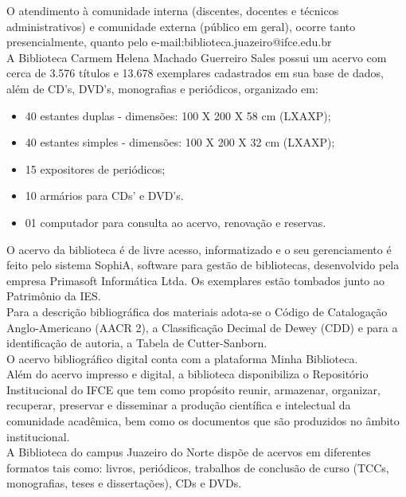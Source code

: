 O atendimento à comunidade interna (discentes, docentes e técnicos administrativos) e comunidade externa (público em geral), ocorre tanto presencialmente, quanto pelo e-mail:biblioteca.juazeiro@ifce.edu.br\\

A Biblioteca Carmem Helena Machado Guerreiro Sales possui um acervo com cerca de 3.576 títulos e 13.678 exemplares cadastrados em sua base de dados, além de CD’s, DVD’s, monografias e periódicos, organizado em:

\begin{itemize}
\item 40 estantes duplas - dimensões: 100 X 200 X 58 cm (LXAXP);
\item 40 estantes simples - dimensões: 100 X 200 X 32 cm (LXAXP);
\item 15 expositores de periódicos;
\item 10 armários para CDs’ e DVD’s.
\item 01 computador para consulta ao acervo, renovação e reservas. 
\end{itemize}

O acervo da biblioteca é de livre acesso, informatizado e o seu gerenciamento é feito pelo sistema SophiA, software para gestão de bibliotecas, desenvolvido pela empresa Primasoft Informática Ltda. Os exemplares estão tombados junto ao Patrimônio da IES.\\

Para a descrição bibliográfica dos materiais adota-se o Código de Catalogação Anglo-Americano (AACR 2), a Classificação Decimal de Dewey (CDD) e para a identificação de autoria, a Tabela de Cutter-Sanborn.\\

O acervo bibliográfico digital conta com a plataforma Minha Biblioteca.\\

Além do acervo impresso e digital, a biblioteca disponibiliza o Repositório Institucional do IFCE que tem como propósito reunir, armazenar, organizar, recuperar, preservar e disseminar a produção científica e intelectual da comunidade acadêmica, bem como os documentos que são produzidos no âmbito institucional.\\

A Biblioteca do campus Juazeiro do Norte dispõe de acervos em diferentes formatos tais como: livros, periódicos, trabalhos de conclusão de curso (TCCs, monografias, teses e dissertações), CDs e DVDs.\\

